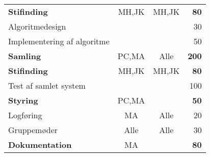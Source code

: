 \begin{center}
\begin{tabular}{l c c r}
	\hspace*{0.3cm} \textbf{Stifinding}									& MH,JK	& MH,JK	& \textbf{80}\\
	\hspace*{0.3cm}\hspace*{0.3cm} Algoritmedesign				&		&		& 30\\
	\hspace*{0.3cm}\hspace*{0.3cm} Implementering af algoritme	&		&		& 50\\
	\hspace*{0.3cm} \textbf{Samling}										& PC,MA	& Alle	& \textbf{200}\\
	\hspace*{0.3cm} \textbf{Stifinding}									& MH,JK	& MH,JK	& \textbf{80}\\
	\hspace*{0.3cm}\hspace*{0.3cm} Test af samlet system		&		&		& 100\\
	\hline
	\textbf{Styring}							& PC,MA	& 		& \textbf{50}\\
	\hspace*{0.3cm} Logføring					& MA	& Alle	& 20\\
	\hspace*{0.3cm} Gruppemøder					& Alle	& Alle	& 30\\
	\hline
	\textbf{Dokumentation}						& MA	&		& \textbf{80}
\end{tabular}
\end{center}